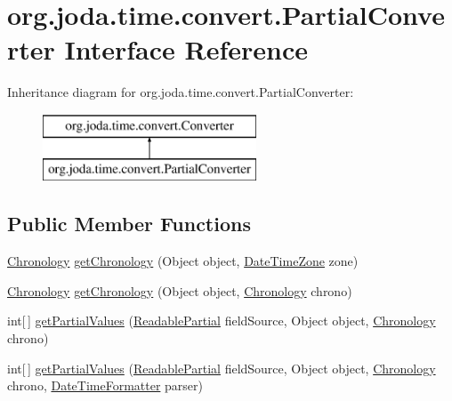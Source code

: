 \hypertarget{interfaceorg_1_1joda_1_1time_1_1convert_1_1_partial_converter}{\section{org.\-joda.\-time.\-convert.\-Partial\-Converter Interface Reference}
\label{interfaceorg_1_1joda_1_1time_1_1convert_1_1_partial_converter}
}
Inheritance diagram for org.\-joda.\-time.\-convert.\-Partial\-Converter\-:\begin{figure}[H]
\begin{center}
\leavevmode
\includegraphics[height=2.000000cm]{interfaceorg_1_1joda_1_1time_1_1convert_1_1_partial_converter}
\end{center}
\end{figure}
\subsection*{Public Member Functions}
\begin{DoxyCompactItemize}
\item 
\hyperlink{classorg_1_1joda_1_1time_1_1_chronology}{Chronology} \hyperlink{interfaceorg_1_1joda_1_1time_1_1convert_1_1_partial_converter_a3c8e132894aaa19ee2061d43f1274c9c}{get\-Chronology} (Object object, \hyperlink{classorg_1_1joda_1_1time_1_1_date_time_zone}{Date\-Time\-Zone} zone)
\item 
\hyperlink{classorg_1_1joda_1_1time_1_1_chronology}{Chronology} \hyperlink{interfaceorg_1_1joda_1_1time_1_1convert_1_1_partial_converter_a734f8d7abbdd725c3f061d1603a32b4a}{get\-Chronology} (Object object, \hyperlink{classorg_1_1joda_1_1time_1_1_chronology}{Chronology} chrono)
\item 
int\mbox{[}$\,$\mbox{]} \hyperlink{interfaceorg_1_1joda_1_1time_1_1convert_1_1_partial_converter_ab8bc9780f1e55585ecbcdd20f6bfb4a1}{get\-Partial\-Values} (\hyperlink{interfaceorg_1_1joda_1_1time_1_1_readable_partial}{Readable\-Partial} field\-Source, Object object, \hyperlink{classorg_1_1joda_1_1time_1_1_chronology}{Chronology} chrono)
\item 
int\mbox{[}$\,$\mbox{]} \hyperlink{interfaceorg_1_1joda_1_1time_1_1convert_1_1_partial_converter_a15cbbcddb2c3ff8a6ef8dda7724abe6d}{get\-Partial\-Values} (\hyperlink{interfaceorg_1_1joda_1_1time_1_1_readable_partial}{Readable\-Partial} field\-Source, Object object, \hyperlink{classorg_1_1joda_1_1time_1_1_chronology}{Chronology} chrono, \hyperlink{classorg_1_1joda_1_1time_1_1format_1_1_date_time_formatter}{Date\-Time\-Formatter} parser)
\end{DoxyCompactItemize}


